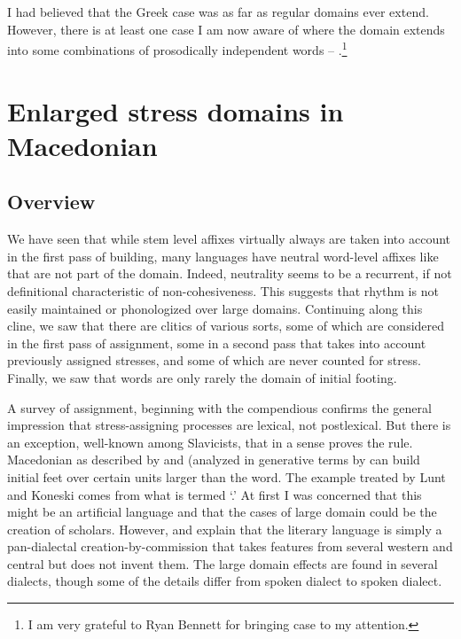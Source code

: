 \documentclass[output=paper,
modfonts
]{LSP/langsci}
\begin{document}
\begin{exe}
I had believed that the Greek case was as far as regular  domains ever extend. However, there is at least one case I am now aware of where the domain extends into some combinations of prosodically independent words -- .\footnote{ I am very grateful to Ryan Bennett for bringing case to my attention.}

\section[Enlarged stress domains in Macedonian]{Enlarged stress domains in Macedonian}\label{sec:kaisse:4}
\subsection[Overview]{Overview}\label{sec:kaisse:4.1}


We have seen that while stem level affixes virtually always are taken into account in the first pass of  building, many languages have  neutral word-level affixes like    that are not part of the  domain. Indeed,  neutrality seems to be a recurrent, if not definitional characteristic of non-cohesiveness. This suggests that rhythm is not easily maintained or phonologized over large domains. Continuing along this cline, we saw that there are clitics of various sorts, some of which are considered in the first pass of  assignment, some in a second pass that takes into account previously assigned stresses, and some of which are never counted for stress. Finally, we saw that  words are only rarely the domain of initial footing. 

A survey of  assignment, beginning with the compendious \citet{hayes1995} confirms the general impression that stress-assigning processes are lexical, not postlexical. But there is an exception, well-known among Slavicists, that in a sense proves the rule. Macedonian as described by \citet{lunt1952} and \citet{koneski1976} (analyzed in generative terms by \citealt{franks1987,franks1989} can build initial feet over certain units larger than the word. The example treated by Lunt and Koneski comes from what is termed ‘.’ At first I was concerned that this might be an artificial language and that the cases of large domain  could be the creation of scholars. However, \citet[5--6]{lunt1952} and \citet{franks1987} explain that the literary language is simply a pan-dialectal creation-by-commission that takes features from several western and central  but does not invent them. The large domain  effects are found in several dialects, though some of the details differ from spoken dialect to spoken dialect. 


\end{exe}
\end{document}
